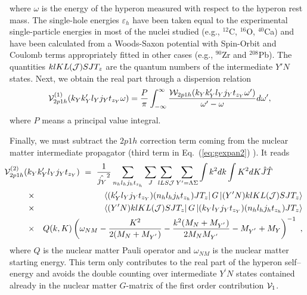 where $\omega$ is the energy of the hyperon measured with respect
to the hyperon rest mass. The single-hole energies $\varepsilon_{h}$ have
been taken equal to the
experimental single-particle energies in most of the nuclei studied (e.g.,
$^{12}$C, $^{16}$O, $^{40}$Ca) and have been calculated from a
Woods-Saxon potential with Spin-Orbit and Coulomb terms appropriately fitted
in other cases (e.g., $^{90}$Zr and $^{208}$Pb). The
quantities
$klKL({\cal J})SJT_z$ are the
quantum numbers of the intermediate $Y'N$ states. Next,
we obtain the real part through a 
dispersion relation
\begin{equation}
   {\cal V}^{(1)}_{2p1h}(k_{Y}k_{Y}'l_{Y}j_{Y}
   t_{z_{Y}} \omega)=
   \frac{P}{\pi} \int_{-\infty}^{\infty}
   \frac{{\cal W}_{2p1h}(k_{Y}k_{Y}'l_{Y}
    j_{Y}
    t_{z_{Y}} \omega')}{\omega'-\omega} d\omega',
    \label{eq:disprel}
\end{equation}
where $P$ means a principal value integral. 


Finally, we must subtract the $2p1h$  correction term 
coming from the nuclear matter intermediate propagator
(third term in Eq.\ (\ref{eq:gexpan2}) ). It reads
\begin{eqnarray}
\lefteqn{\hspace{-0.5cm}{\cal V}^{(2)}_{2p1h}(k_{Y}k_{Y}'l_{Y}   
      j_{Y}t_{z_{Y}}) \ = \
      {\displaystyle \frac{1}
      {\hat{j_{Y}}^2}\sum_{n_hl_hj_ht_{z_h}}
      \sum_{J}\sum_{lLS{\cal J}}\sum_{Y'=\Lambda\Sigma}\int k^{2}dk
      \int K^{2}dK\hat{J}\hat{T}}}\hspace{0.5cm}\nonumber \\
      &\times& \left\langle (k_{Y}'l_{Y}j_{Y} 
      t_{z_{Y}})(n_hl_hj_ht_{z_h})JT_z\right | 
      G\left | (Y'N)klKL({\cal J})SJT_z \right \rangle\nonumber \\
      &\times& \left\langle (Y'N)klKL({\cal J})SJT_z \right | G
      \left | (k_{Y}l_{Y}j_{Y}
      t_{z_{Y}})(n_hl_hj_ht_{z_h})JT_z \right \rangle \nonumber
      \\
      &\times& Q(k,K)\left(\omega_{NM} -\frac{K^2}{2(M_N+M_{Y^{'}})} -
      \frac{k^2(M_N+M_{Y^{'}})}{2M_NM_{Y^{'}}}-M_{Y^{'}}+M_Y\right)^{-1} \
,
   \label{eq:vc}
\end{eqnarray}
where $Q$ is the nuclear matter Pauli operator
and $\omega_{NM}$ is the nuclear matter starting
energy.
This term only contributes to the real part
of the hyperon self--energy and avoids the double counting over
intermediate $Y^\prime N$ states contained already in the nuclear
matter $G$-matrix of the first order contribution ${\cal V}_{1}$.

